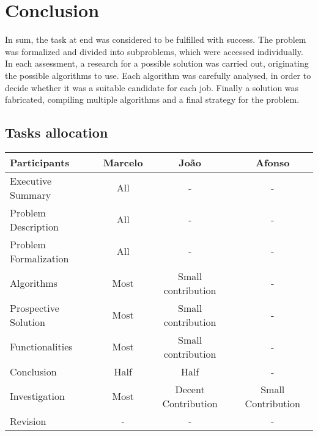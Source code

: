 \chapter{Conclusion}

In sum, the task at end was considered to be fulfilled with success. The problem was formalized and divided into subproblems, which were accessed individually. In each assessment, a research for a possible solution was carried out, originating the possible algorithms to use. Each algorithm was carefully analysed, in order to decide whether it was a suitable candidate for each job. Finally a solution was fabricated, compiling multiple algorithms and a final strategy for the problem.

\section{Tasks allocation}
\begin{center}
    \begin{tabular}{l | c  c  c}
        \textbf{Participants}           & \textbf{Marcelo} & \textbf{João} & \textbf{Afonso} \\ \hline
        Executive Summary                     & All & - & - \\
        Problem Description                   & All & - & -   \\
        Problem Formalization                 & All & - & - \\
        Algorithms                            & Most & Small contribution & -   \\
        Prospective Solution                  & Most & Small contribution & -   \\
        Functionalities                       & Most & Small contribution & -   \\
        Conclusion                            & Half & Half & -   \\
        Investigation                         & Most & Decent Contribution & Small Contribution \\
        Revision                              & - & - & - 
    \end{tabular}
\end{center}